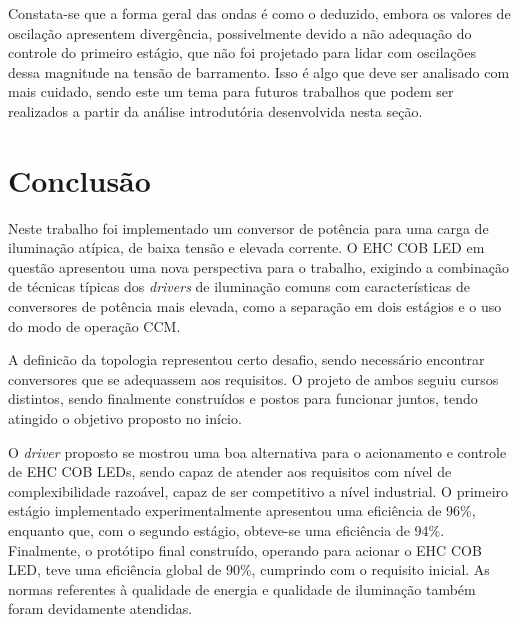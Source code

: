 \documentclass[
        12pt,
        openany, %
        oneside, %
        a4paper,			
        english,			
        brazil
        ]{abntbibufjf}
\begin{document}
Constata-se que a forma geral das ondas é como o deduzido, embora os valores de oscilação apresentem divergência, possivelmente devido a não adequação do controle do primeiro estágio, que não foi projetado para lidar com oscilações dessa magnitude na tensão de barramento. Isso é algo que deve ser analisado com mais cuidado, sendo este um tema para futuros trabalhos que podem ser realizados a partir da análise introdutória desenvolvida nesta seção.





\chapter{Conclusão}

Neste trabalho foi implementado um conversor de potência para uma carga de iluminação atípica, de baixa tensão e elevada corrente. O EHC COB LED em questão apresentou uma nova perspectiva para o trabalho, exigindo a combinação de técnicas típicas dos \textit{drivers} de iluminação comuns com características de conversores de potência mais elevada, como a separação em dois estágios e o uso do modo de operação CCM.

A definicão da topologia representou certo desafio, sendo necessário encontrar conversores que se adequassem aos requisitos. O projeto de ambos seguiu cursos distintos, sendo finalmente construídos e postos para funcionar juntos, tendo atingido o objetivo proposto no início.


O \textit{driver} proposto se mostrou uma boa alternativa para o acionamento e controle de EHC COB LEDs, sendo capaz de atender aos requisitos com nível de complexibilidade razoável, capaz de ser competitivo a nível industrial. O primeiro estágio implementado experimentalmente apresentou uma eficiência de 96\%, enquanto que, com o segundo estágio, obteve-se uma eficiência de 94\%. Finalmente, o protótipo final construído, operando para acionar o EHC COB LED, teve uma eficiência global de 90\%, cumprindo com o requisito inicial. As normas referentes à qualidade de energia e qualidade de iluminação também foram devidamente atendidas.
\end{document}
